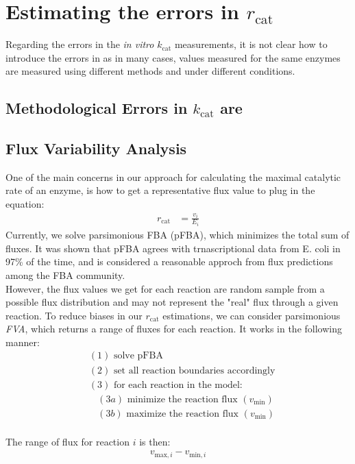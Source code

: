\documentclass{article}
\newcommand{\kcat}{$k_\mathrm{cat}$ }
\newcommand{\rcat}{$r_\mathrm{cat}$ }
\begin{document}
\section*{Estimating the errors in \rcat}

Regarding the errors in the \textit{in vitro} \kcat measurements,  it is not clear how to introduce the errors in  as in many cases, values measured for the same enzymes are measured using different methods and under different conditions.
\subsection*{Methodological Errors in \kcat are }
\subsection*{Flux Variability Analysis}
One of the main concerns in our approach for calculating the maximal catalytic rate of an enzyme, is how to get a representative flux value to plug in the equation:
\begin{align}
r_\mathrm{cat} &= \frac{v_i}{E_i} 
\end{align}
Currently, we solve parsimonious FBA (pFBA), which minimizes the total sum of fluxes. It was shown that pFBA agrees with trnascriptional data from E. coli in 97\% of the time, and is considered a reasonable approch from flux predictions among the FBA community.\\
However, the flux values we get for each reaction are random sample from a possible flux distribution and may not represent the "real" flux through a given reaction. To reduce biases in our \rcat estimations, we can consider parsimonious \emph{FVA}, which returns a range of fluxes for each reaction. It works in the following manner:
\begin{align*}
&(1)\text{ solve pFBA} \\
&(2)\text{ set all reaction boundaries accordingly} \\
&(3)\text{ for each reaction in the model:} \\
&~~~~ (3a)\text{ minimize the reaction flux } (v_\mathrm{min}) \\
&~~~~ (3b)\text{ maximize the reaction flux } (v_\mathrm{min}) \\
\end{align*}

The range of flux for reaction $i$ is then:
\begin{align}
v_{\mathrm{max}, i} - v_{\mathrm{min}, i} \\
\end{align}
\end{document}

